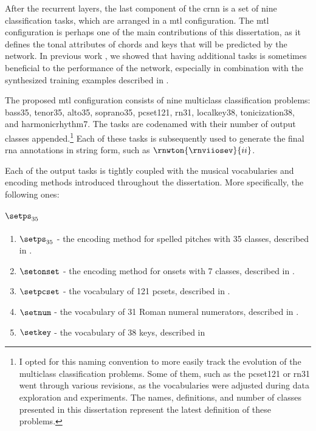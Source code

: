 
After the recurrent layers, the last component of the
\gls{crnn} is a set of nine classification tasks, which are
arranged in a \gls{mtl} configuration. The \gls{mtl}
configuration is perhaps one of the main contributions of
this dissertation, as it defines the tonal attributes of
chords and keys that will be predicted by the network. In
previous work \parencite{napoleslopez2021augmentednet}, we
showed that having additional tasks is sometimes beneficial
to the performance of the network, especially in combination
with the synthesized training examples described in
.

The proposed \gls{mtl} configuration consists of nine
multiclass classification problems: \gls{bass35},
\gls{tenor35}, \gls{alto35}, \gls{soprano35},
\gls{pcset121}, \gls{rn31}, \gls{localkey38},
\gls{tonicization38}, and \gls{harmonicrhythm7}. The tasks
are codenamed with their number of output classes
appended.\footnote{I opted for this naming convention to
more easily track the evolution of the multiclass
classification problems. Some of them, such as the
\gls{pcset121} or \gls{rn31} went through various revisions,
as the vocabularies were adjusted during data exploration
and experiments. The names, definitions, and number of
classes presented in this dissertation represent the latest
definition of these problems.} Each of these tasks is
subsequently used to generate the final \gls{rna}
annotations in string form, such as
$\rnwton{\rnviiosev}{ii}$.

Each of the output tasks is tightly coupled with the musical
vocabularies and encoding methods introduced throughout the
dissertation. More specifically, the following ones:

\paragraph{$\setps_{35}$}


\begin{enumerate}
    \item $\setps_{35}$ - the encoding method for spelled
    pitches with 35 classes, described in
    .
    \item $\setonset$ - the encoding method for onsets with 7
    classes, described in
    .
    \item $\setpcset$ - the vocabulary of 121 \gls{pcset}s,
    described in .
    \item $\setnum$ - the vocabulary of 31 Roman numeral
    numerators, described in
    .
    \item $\setkey$ - the vocabulary of 38 keys, described in
\end{enumerate}
